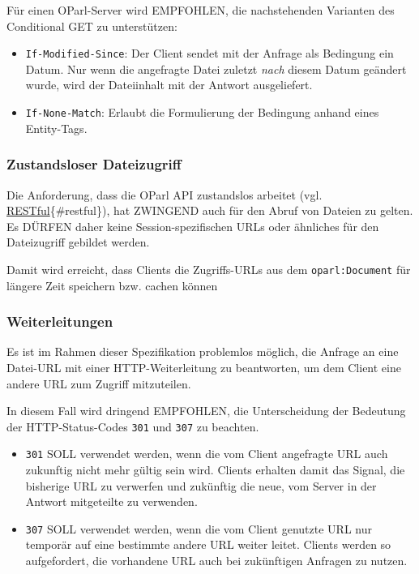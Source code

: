 \documentclass[,a4paper]{article}
\begin{document}
Für einen OParl-Server wird EMPFOHLEN, die nachstehenden Varianten des
Conditional GET zu unterstützen:

\begin{itemize}
\item
  \texttt{If-Modified-Since}: Der Client sendet mit der Anfrage als
  Bedingung ein Datum. Nur wenn die angefragte Datei zuletzt \emph{nach}
  diesem Datum geändert wurde, wird der Dateiinhalt mit der Antwort
  ausgeliefert.
\item
  \texttt{If-None-Match}: Erlaubt die Formulierung der Bedingung anhand
  eines Entity-Tags.
\end{itemize}

\subsubsection{Zustandsloser
Dateizugriff}\label{zustandsloser-dateizugriff}

Die Anforderung, dass die OParl API zustandslos arbeitet (vgl.
\hyperref[restful]{RESTful}\{\#restful\}), hat ZWINGEND auch für den
Abruf von Dateien zu gelten. Es DÜRFEN daher keine Session-spezifischen
URLs oder ähnliches für den Dateizugriff gebildet werden.

Damit wird erreicht, dass Clients die Zugriffs-URLs aus dem
\texttt{oparl:Document} für längere Zeit speichern bzw. cachen können

\subsubsection{Weiterleitungen}\label{weiterleitungen}

Es ist im Rahmen dieser Spezifikation problemlos möglich, die Anfrage an
eine Datei-URL mit einer HTTP-Weiterleitung zu beantworten, um dem
Client eine andere URL zum Zugriff mitzuteilen.

In diesem Fall wird dringend EMPFOHLEN, die Unterscheidung der Bedeutung
der HTTP-Status-Codes \texttt{301} und \texttt{307} zu beachten.

\begin{itemize}
\item
  \texttt{301} SOLL verwendet werden, wenn die vom Client angefragte URL
  auch zukunftig nicht mehr gültig sein wird. Clients erhalten damit das
  Signal, die bisherige URL zu verwerfen und zukünftig die neue, vom
  Server in der Antwort mitgeteilte zu verwenden.
\item
  \texttt{307} SOLL verwendet werden, wenn die vom Client genutzte URL
  nur temporär auf eine bestimmte andere URL weiter leitet. Clients
  werden so aufgefordert, die vorhandene URL auch bei zukünftigen
  Anfragen zu nutzen.
\end{itemize}
\end{document}
